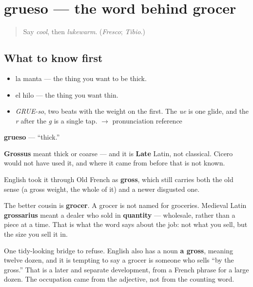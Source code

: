 \section[grueso]{grueso — the word behind grocer}

\label{lesson:ES-C379-grueso}



\begin{quote}
Say \emph{cool}, then \emph{lukewarm}. (\emph{Fresco}; \emph{Tibio}.)
\end{quote}

\subsection*{What to know first}
\begin{itemize}
\raggedright
  \item la manta — the thing you want to be thick.
  \item el hilo — the thing you want thin.
\end{itemize}

\begin{sounds}
\begin{itemize}
\raggedright
  \item \emph{GRUE-so}, two beats with the weight on the first. The \emph{ue} is one glide, and the \emph{r} after the \emph{g} is a single tap. $\to$ pronunciation reference
\end{itemize}
\end{sounds}

\begin{cousinweb}
\textbf{grueso} — \textquotedblleft{}thick.\textquotedblright{}

\textbf{Grossus} meant thick or coarse — and it is \textbf{Late} Latin, not classical. Cicero would not have used it, and where it came from before that is not known.

English took it through Old French as \textbf{gross}, which still carries both the old sense (a gross weight, the whole of it) and a newer disgusted one.

The better cousin is \textbf{grocer}. A grocer is not named for groceries. Medieval Latin \textbf{grossarius} meant a dealer who sold in \textbf{quantity} — wholesale, rather than a piece at a time. That is what the word says about the job: not what you sell, but the size you sell it in.

One tidy-looking bridge to refuse. English also has a noun \textbf{a gross}, meaning twelve dozen, and it is tempting to say a grocer is someone who sells \textquotedblleft{}by the gross.\textquotedblright{} That is a later and separate development, from a French phrase for a large dozen. The occupation came from the adjective, not from the counting word.
\end{cousinweb}

